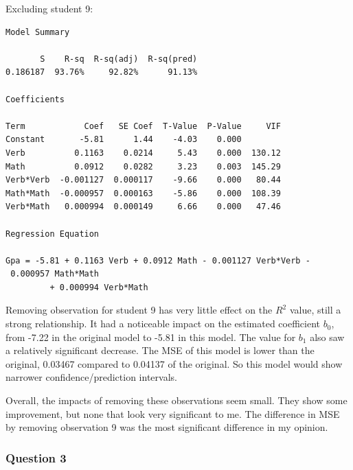 \documentclass{article}
\begin{document}
\begin{enumerate}
Excluding student 9:

\begin{verbatim}
Model Summary

       S    R-sq  R-sq(adj)  R-sq(pred)
0.186187  93.76%     92.82%      91.13%

Coefficients

Term            Coef   SE Coef  T-Value  P-Value     VIF
Constant       -5.81      1.44    -4.03    0.000
Verb          0.1163    0.0214     5.43    0.000  130.12
Math          0.0912    0.0282     3.23    0.003  145.29
Verb*Verb  -0.001127  0.000117    -9.66    0.000   80.44
Math*Math  -0.000957  0.000163    -5.86    0.000  108.39
Verb*Math   0.000994  0.000149     6.66    0.000   47.46

Regression Equation

Gpa = -5.81 + 0.1163 Verb + 0.0912 Math - 0.001127 Verb*Verb - 0.000957 Math*Math 
         + 0.000994 Verb*Math
\end{verbatim}

Removing observation for student 9 has very little effect on the \(R^2\)
value, still a strong relationship. It had a noticeable impact on the
estimated coefficient \(b_0\), from -7.22 in the original model to -5.81
in this model. The value for \(b_1\) also saw a relatively significant
decrease. The MSE of this model is lower than the original, 0.03467
compared to 0.04137 of the original. So this model would show narrower
confidence/prediction intervals.

Overall, the impacts of removing these observations seem small. They
show some improvement, but none that look very significant to me. The
difference in MSE by removing observation 9 was the most significant
difference in my opinion.
\end{enumerate}

    \subsubsection{Question 3}\label{question-3}
\end{document}
